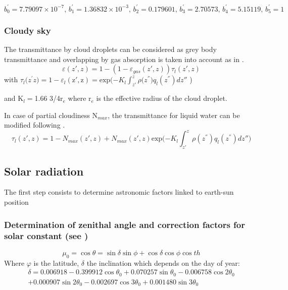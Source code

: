 \begin{equation}
b_{0}^{'}=7.79097\times {10}^{-7},\, b_{1}^{'}=1.36832\times {10}^{-3},\,
b_{2}^{'}=0.179601,\, b_{3}^{'}=2.70573,\, b_{4}^{'}=5.15119,\, b_{5}^{'}=1
\end{equation}

\subsubsection{Cloudy sky}
The transmittance by cloud droplets can be considered as grey body
transmittance and overlapping by gas absorption is taken into account as
in \cite{Sasamori:1972}.
\begin{equation}
\varepsilon \left( z',z \right)=1-\left( 1-\varepsilon_{gas}\left( z',z
\right) \right)\tau_{l}\left( z',z \right)
\end{equation}
with $\tau_{l}\mathrm{(}z^{\mathrm{'}}z\mathrm{)=1-}\varepsilon
_{l}\mathrm{(z',z)=exp(-}K_{l}\int_{z\mathrm{'}}^z
{\rho \mathrm{(}z^{\mathrm{''}}\mathrm{)}q_{l}\left( z^{\mathrm{''}}
\right)dz\mathrm{''}} $ )

and K$_{l}=$1.66 3/4r$_{e}$ where r$_{e}$ is the
effective radius of the cloud droplet.

In case of partial cloudiness N$_{max}$, the transmittance for liquid water
can be modified following \cite{Bougeault:1985}.
\begin{equation}
\tau_{l}\left( z',z \right)=1-N_{max}\left( z',z
\right)+N_{max}(z',z)\mathrm{exp}(-K_{l}\int_{z'}^z {\rho
(z^{''})q_{l}\left( z^{''} \right)dz'')}
\end{equation}


\subsection{Solar radiation}
The first step consists to determine astronomic factors linked to earth-sun
position

\subsubsection{Determination of zenithal angle and correction factors for solar
constant (see \cite{Paltridge:1974})}

\begin{equation}
\mu_{0}=\cos \theta =\sin \delta \sin \phi +\cos \delta \cos \phi \cos
{th}
\end{equation}
Where $\varphi $ is the latitude, $\delta $ the inclination which depends on
the day of year:
\begin{multline}
\delta =
0.006918
-0.399912\cos \theta_{0}
+0.070257\sin \theta_{0}
-0.006758\cos 2\theta_{0}\\
+0.000907\sin 2\theta_{0}
-0.002697\cos 3\theta_{0}
+0.001480\sin 3\theta_{0}
\end{multline}

